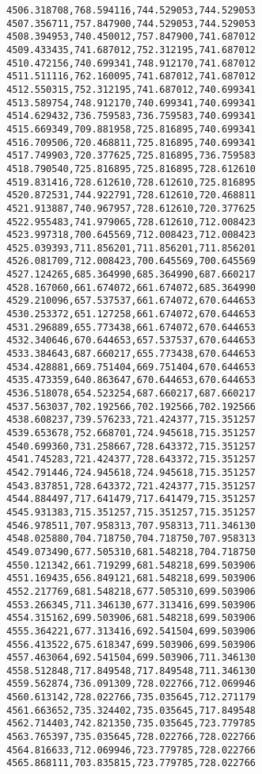 \documentclass[11pt]{article}
\begin{document}
\begin{Verbatim}[commandchars=\\\{\}]
4506.318708,768.594116,744.529053,744.529053
4507.356711,757.847900,744.529053,744.529053
4508.394953,740.450012,757.847900,741.687012
4509.433435,741.687012,752.312195,741.687012
4510.472156,740.699341,748.912170,741.687012
4511.511116,762.160095,741.687012,741.687012
4512.550315,752.312195,741.687012,740.699341
4513.589754,748.912170,740.699341,740.699341
4514.629432,736.759583,736.759583,740.699341
4515.669349,709.881958,725.816895,740.699341
4516.709506,720.468811,725.816895,740.699341
4517.749903,720.377625,725.816895,736.759583
4518.790540,725.816895,725.816895,728.612610
4519.831416,728.612610,728.612610,725.816895
4520.872531,744.922791,728.612610,720.468811
4521.913887,740.967957,728.612610,720.377625
4522.955483,741.979065,728.612610,712.008423
4523.997318,700.645569,712.008423,712.008423
4525.039393,711.856201,711.856201,711.856201
4526.081709,712.008423,700.645569,700.645569
4527.124265,685.364990,685.364990,687.660217
4528.167060,661.674072,661.674072,685.364990
4529.210096,657.537537,661.674072,670.644653
4530.253372,651.127258,661.674072,670.644653
4531.296889,655.773438,661.674072,670.644653
4532.340646,670.644653,657.537537,670.644653
4533.384643,687.660217,655.773438,670.644653
4534.428881,669.751404,669.751404,670.644653
4535.473359,640.863647,670.644653,670.644653
4536.518078,654.523254,687.660217,687.660217
4537.563037,702.192566,702.192566,702.192566
4538.608237,739.576233,721.424377,715.351257
4539.653678,752.668701,724.945618,715.351257
4540.699360,731.258667,728.643372,715.351257
4541.745283,721.424377,728.643372,715.351257
4542.791446,724.945618,724.945618,715.351257
4543.837851,728.643372,721.424377,715.351257
4544.884497,717.641479,717.641479,715.351257
4545.931383,715.351257,715.351257,715.351257
4546.978511,707.958313,707.958313,711.346130
4548.025880,704.718750,704.718750,707.958313
4549.073490,677.505310,681.548218,704.718750
4550.121342,661.719299,681.548218,699.503906
4551.169435,656.849121,681.548218,699.503906
4552.217769,681.548218,677.505310,699.503906
4553.266345,711.346130,677.313416,699.503906
4554.315162,699.503906,681.548218,699.503906
4555.364221,677.313416,692.541504,699.503906
4556.413522,675.618347,699.503906,699.503906
4557.463064,692.541504,699.503906,711.346130
4558.512848,717.849548,717.849548,711.346130
4559.562874,736.091309,728.022766,712.069946
4560.613142,728.022766,735.035645,712.271179
4561.663652,735.324402,735.035645,717.849548
4562.714403,742.821350,735.035645,723.779785
4563.765397,735.035645,728.022766,728.022766
4564.816633,712.069946,723.779785,728.022766
4565.868111,703.835815,723.779785,728.022766

\end{Verbatim}
\end{document}
